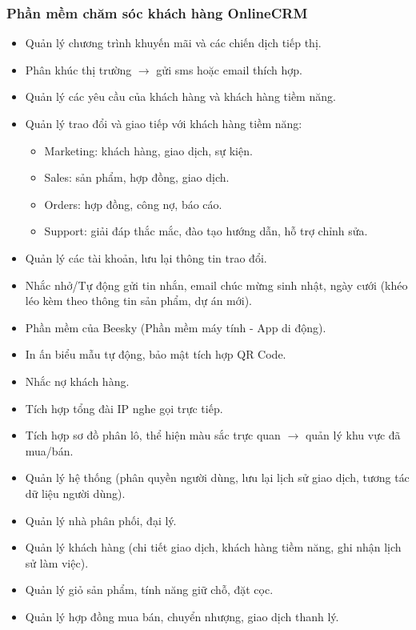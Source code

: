 \documentclass[12pt,a4paper]{article}
\begin{document}
    \subsubsection*{Phần mềm chăm sóc khách hàng OnlineCRM}
    \begin{itemize}
        \item Quản lý chương trình khuyến mãi và các chiến dịch tiếp thị.
        \item Phân khúc thị trường $\rightarrow$ gửi sms hoặc email thích hợp.
        \item Quản lý các yêu cầu của khách hàng và khách hàng tiềm năng.
        \item Quản lý trao đổi và giao tiếp với khách hàng tiềm năng:
        \begin{itemize}
            \item Marketing: khách hàng, giao dịch, sự kiện.
            \item Sales: sản phẩm, hợp đồng, giao dịch.
            \item Orders: hợp đồng, công nợ, báo cáo.
            \item Support: giải đáp thắc mắc, đào tạo hướng dẫn, hỗ trợ chỉnh sửa.
        \end{itemize}
        \item Quản lý các tài khoản, lưu lại thông tin trao đổi.
        \item Nhắc nhở/Tự động gửi tin nhắn, email chúc mừng sinh nhật, ngày cưới (khéo léo kèm theo thông tin sản phẩm, dự án mới).
        \item Phần mềm của Beesky (Phần mềm máy tính - App di động).
        \item In ấn biểu mẫu tự động, bảo mật tích hợp QR Code.
        \item Nhắc nợ khách hàng.
        \item Tích hợp tổng đài IP nghe gọi trực tiếp.
        \item Tích hợp sơ đồ phân lô, thể hiện màu sắc trực quan $\rightarrow$ quản lý khu vực đã mua/bán.
        \item Quản lý hệ thống (phân quyền người dùng, lưu lại lịch sử giao dịch, tương tác dữ liệu người dùng).
        \item Quản lý nhà phân phối, đại lý.
        \item Quản lý khách hàng (chi tiết giao dịch, khách hàng tiềm năng, ghi nhận lịch sử làm việc).
        \item Quản lý giỏ sản phẩm, tính năng giữ chỗ, đặt cọc.
        \item Quản lý hợp đồng mua bán, chuyển nhượng, giao dịch thanh lý.

\end{itemize}
\end{document}
